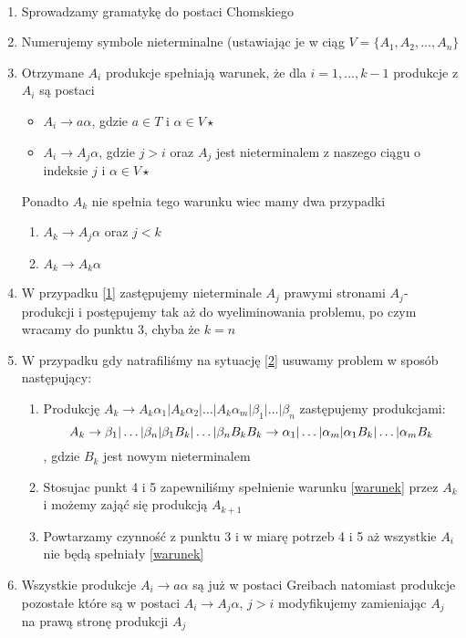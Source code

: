 	\begin{alg}~\\
		\begin{enumerate}
			\item Sprowadzamy gramatykę do postaci Chomskiego
			\item Numerujemy symbole nieterminalne (ustawiając je w ciąg $V = \{A_1, A_2, \dots, A_n\}$
			\item Otrzymane $A_i$ produkcje spełniają warunek, że dla $i=1,\dots, k-1$ produkcje z $A_i$ są postaci
				\begin{itemize}\label{warunek}
					\item $A_i \rightarrow a\alpha$, gdzie $a\in T$ i $\alpha\in V\star$
					\item $A_i \rightarrow A_j\alpha$, gdzie $j > i$ 
					oraz $A_j$ jest nieterminalem z naszego ciągu o indeksie $j$ i $\alpha \in V\star$
				\end{itemize}
			Ponadto $A_k$ nie spełnia tego warunku wiec mamy dwa przypadki
				\begin{enumerate}
					\item $A_k \rightarrow A_j\alpha$ oraz $j < k$\label{1}
					\item $A_k \rightarrow A_k\alpha$\label{2}
				\end{enumerate}
			\item W przypadku \ref{1} zastępujemy nieterminale $A_j$ prawymi stronami $A_j$-produkcji
			i postępujemy tak aż do wyeliminowania problemu, po czym wracamy do punktu 3, chyba że $k = n$
			\item W przypadku gdy natrafiliśmy na sytuację \ref{2} usuwamy problem w sposób następujący:
				\begin{enumerate}
					\item Produkcję $A_k \rightarrow A_k\alpha_1|A_k\alpha_2|\dots|A_k\alpha_m|\beta_1|\dots|\beta_n$
					zastępujemy produkcjami:
					$$
						A_k \rightarrow \beta_1|\dots|\beta_n|\beta_1B_k|\dots|\beta_nB_k \\
						B_k \rightarrow \alpha_1|\dots|\alpha_m|\alpha_1B_k|\dots|\alpha_mB_k
					$$, gdzie $B_k$ jest nowym nieterminalem
					\item Stosujac punkt 4 i 5 zapewniliśmy spełnienie warunku \ref{warunek} przez $A_k$ i możemy zająć się produkcją $A_{k+1}$
					\item Powtarzamy czynność z punktu 3 i w miarę potrzeb 4 i 5 aż wszystkie $A_i$ nie będą spełniały \ref{warunek}
				\end{enumerate}
			\item Wszystkie produkcje $A_i \rightarrow a\alpha$ są już w postaci Greibach natomiast produkcje pozostałe które są w postaci
			$A_i\rightarrow A_j\alpha$, $j > i$ modyfikujemy zamieniając $A_j$ na prawą stronę produkcji $A_j$
		\end{enumerate}
	\end{alg}
	

